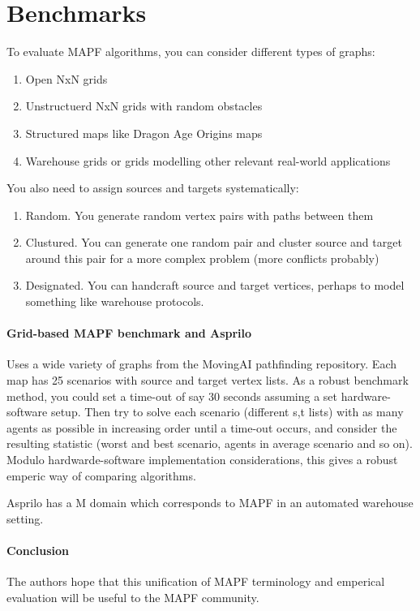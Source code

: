 \documentclass[a4paper,10pt,english]{article}
\begin{document}
	\section{Benchmarks}
	To evaluate MAPF algorithms, you can consider different types of graphs:
	\begin{enumerate}
		\item Open NxN grids
		\item Unstructuerd NxN grids with random obstacles
		\item Structured maps like Dragon Age Origins maps
		\item Warehouse grids or grids modelling other relevant real-world applications
	\end{enumerate}
	You also need to assign sources and targets systematically:
		\begin{enumerate}
			\item Random. You generate random vertex pairs with paths between them
			\item Clustured. You can generate one random pair and cluster source and target around this pair for a more complex problem (more conflicts probably)
			\item Designated. You can handcraft source and target vertices, perhaps to model something like warehouse protocols.
	\end{enumerate}
	\paragraph{Grid-based MAPF benchmark and Asprilo}
	Uses a wide variety of graphs from the MovingAI pathfinding repository. Each map has 25 scenarios with source and target vertex lists. As a robust benchmark method, you could set a time-out of say 30 seconds assuming a set hardware-software setup. Then try to solve each scenario (different s,t lists) with as many agents as possible in increasing order until a time-out occurs, and consider the resulting statistic (worst and best scenario, agents in average scenario and so on). Modulo hardwarde-software implementation considerations, this gives a robust emperic way of comparing algorithms.
	
	Asprilo has a M domain which corresponds to MAPF in an automated warehouse setting.
	
	\paragraph{Conclusion}
	The authors hope that this unification of MAPF terminology and emperical evaluation will be useful to the MAPF community.
	\printbibliography
	
\end{document}
